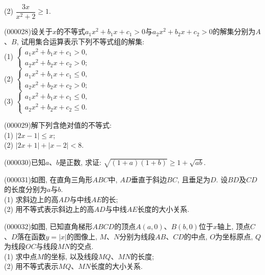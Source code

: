 (2) $\dfrac{3x}{x^2+2}\ge 1$.
\item (000028)设关于$x$的不等式$a_1x^2+b_1x+c_1>0$与$a_2x^2+b_2x+c_2>0$的解集分别为$A$、$B$,
试用集合运算表示下列不等式组的解集:\\
(1) $\begin{cases} a_1x^2+b_1x+c_1>0, \\ a_2x^2+b_2x+c_2>0;\end{cases}$\\
(2) $\begin{cases} a_1x^2+b_1x+c_1\le 0, \\ a_2x^2+b_2x+c_2>0;\end{cases}$\\
(3) $\begin{cases} a_1x^2+b_1x+c_1\le 0, \\ a_2x^2+b_2x+c_2\le 0.\end{cases}$
\item (000029)解下列含绝对值的不等式:\\
(1) $|2x-1|\le x$;\\
(2) $|2x+1|+|x-2|<8$.
\item (000030)已知$a$、$b$是正数, 求证: $\sqrt{(1+a)(1+b)}\ge 1+\sqrt{ab}$.
\item (000031)如图, 在直角三角形$ABC$中, $AD$垂直于斜边$BC$, 且垂足为$D$. 设$BD$及$CD$的长度分别为$a$与$b$.\\
(1) 求斜边上的高$AD$与中线$AE$的长;\\
(2) 用不等式表示斜边上的高$AD$与中线$AE$长度的大小关系.
\begin{center}
\end{center}
\item (000032)如图, 已知直角梯形$ABCD$的顶点$A(a, 0)$、$B(b, 0)$位于$x$轴上, 顶点$C$、$D$落在函数$y=|x|$的图像上, $M$、$N$分别为线段$AB$、$CD$的中点, $O$为坐标原点, $Q$为线段$OC$与线段$MN$的交点.\\
(1) 求中点$M$的坐标, 以及线段$MQ$、$MN$的长度;\\
(2) 用不等式表示$MQ$、$MN$长度的大小关系.
